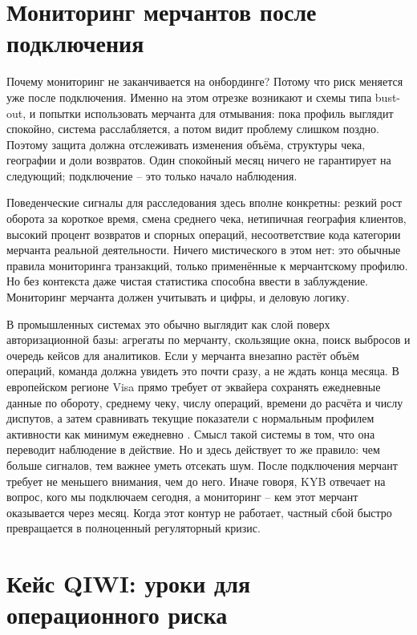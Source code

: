 \section{Мониторинг мерчантов после подключения}
\label{sec:compliance-merchant-monitoring}

Почему мониторинг не заканчивается на онбординге? Потому что риск
меняется уже после подключения. Именно на этом отрезке возникают и
схемы типа bust-out, и попытки использовать мерчанта для отмывания:
пока профиль выглядит спокойно, система расслабляется, а потом
видит проблему слишком поздно. Поэтому защита должна отслеживать
изменения объёма, структуры чека, географии и доли возвратов. Один
спокойный месяц ничего не гарантирует на следующий; подключение --
это только начало наблюдения.

Поведенческие сигналы для расследования здесь вполне конкретны:
резкий рост оборота за короткое время, смена среднего чека,
нетипичная география клиентов, высокий процент возвратов и
спорных операций, несоответствие кода категории мерчанта реальной
деятельности. Ничего мистического в этом нет: это обычные правила
мониторинга транзакций, только применённые к мерчантскому профилю.
Но без контекста даже чистая статистика способна ввести в
заблуждение. Мониторинг мерчанта должен учитывать и цифры, и
деловую логику.

В промышленных системах это обычно выглядит как слой поверх
авторизационной базы: агрегаты по мерчанту, скользящие окна,
поиск выбросов и очередь кейсов для аналитиков. Если у мерчанта
внезапно растёт объём операций, команда должна увидеть это почти
сразу, а не ждать конца месяца. В европейском регионе Visa прямо
требует от эквайера сохранять ежедневные данные по обороту, среднему
чеку, числу операций, времени до расчёта и числу диспутов, а затем
сравнивать текущие показатели с нормальным профилем активности как
минимум ежедневно \cite{visa-core-rules}. Смысл такой системы в том,
что она переводит наблюдение в действие. Но и здесь действует то же
правило: чем больше сигналов, тем важнее уметь отсекать шум. После
подключения мерчант требует не меньшего внимания, чем до него.
Иначе говоря, KYB отвечает на вопрос, кого мы подключаем сегодня,
а мониторинг -- кем этот мерчант оказывается через месяц. Когда
этот контур не работает, частный сбой быстро превращается в
полноценный регуляторный кризис.

\section{Кейс QIWI: уроки для операционного риска}
\label{sec:compliance-qiwi}

